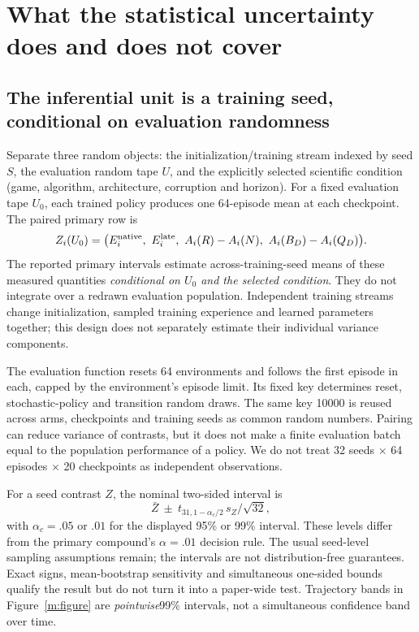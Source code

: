 \section{What the statistical uncertainty does and does not cover}\label{m:uncertainty}
\subsection{The inferential unit is a training seed, conditional on evaluation randomness}
Separate three random objects: the initialization/training stream indexed by seed $S$, the evaluation random tape $U$, and the explicitly selected scientific condition (game, algorithm, architecture, corruption and horizon). For a fixed evaluation tape $U_0$, each trained policy produces one 64-episode mean at each checkpoint. The paired primary row is
\begin{equation}
Z_i(U_0)=\bigl(E_i^{\rm native},\ E_i^{\rm late},\ A_i(R)-A_i(N),\ A_i(B_D)-A_i(Q_D)\bigr).
\end{equation}
The reported primary intervals estimate across-training-seed means of these measured quantities \emph{conditional on $U_0$ and the selected condition}. They do not integrate over a redrawn evaluation population. Independent training streams change initialization, sampled training experience and learned parameters together; this design does not separately estimate their individual variance components.

The evaluation function resets 64 environments and follows the first episode in each, capped by the environment's episode limit. Its fixed key determines reset, stochastic-policy and transition random draws. The same key 10000 is reused across arms, checkpoints and training seeds as common random numbers. Pairing can reduce variance of contrasts, but it does not make a finite evaluation batch equal to the population performance of a policy. We do not treat 32 seeds $\times$ 64 episodes $\times$ 20 checkpoints as independent observations.

For a seed contrast $Z$, the nominal two-sided interval is
\begin{equation}
\bar Z\ \pm\ t_{31,1-\alpha_c/2}\,s_Z/\sqrt{32},
\end{equation}
with $\alpha_c=.05$ or $.01$ for the displayed 95\% or 99\% interval. These levels differ from the primary compound's $\alpha=.01$ decision rule. The usual seed-level sampling assumptions remain; the intervals are not distribution-free guarantees. Exact signs, mean-bootstrap sensitivity and simultaneous one-sided bounds qualify the result but do not turn it into a paper-wide test. Trajectory bands in Figure~\ref{m:figure} are \emph{pointwise}99\% intervals, not a simultaneous confidence band over time.

